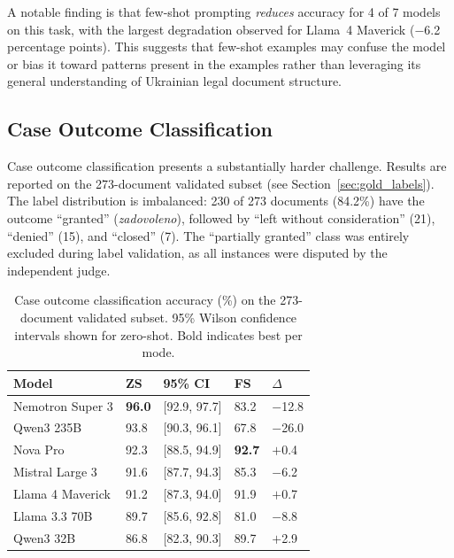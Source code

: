 \documentclass[11pt,a4paper]{article}
\begin{document}
A notable finding is that few-shot prompting \emph{reduces} accuracy for 4 of 7 models on this task, with the largest degradation observed for Llama~4 Maverick ($-$6.2 percentage points). This suggests that few-shot examples may confuse the model or bias it toward patterns present in the examples rather than leveraging its general understanding of Ukrainian legal document structure.

\subsection{Case Outcome Classification}
\label{sec:results_outcome}

Case outcome classification presents a substantially harder challenge. Results are reported on the 273-document validated subset (see Section~\ref{sec:gold_labels}). The label distribution is imbalanced: 230 of 273 documents (84.2\%) have the outcome ``granted'' (\textit{zadovoleno}), followed by ``left without consideration'' (21), ``denied'' (15), and ``closed'' (7). The ``partially granted'' class was entirely excluded during label validation, as all instances were disputed by the independent judge.

\begin{table}[t]
\centering
\caption{Case outcome classification accuracy (\%) on the 273-document validated subset. 95\% Wilson confidence intervals shown for zero-shot. Bold indicates best per mode.}
\label{tab:case_outcome}
\begin{tabular}{lR{1.6cm}R{2.6cm}R{1.6cm}R{1.6cm}}
\toprule
\textbf{Model} & \textbf{ZS} & \textbf{95\% CI} & \textbf{FS} & \textbf{$\Delta$} \\
\midrule
Nemotron Super 3  & \textbf{96.0} & [92.9, 97.7] & 83.2 & $-$12.8 \\
Qwen3 235B        & 93.8          & [90.3, 96.1] & 67.8 & $-$26.0 \\
Nova Pro          & 92.3          & [88.5, 94.9] & \textbf{92.7} & $+$0.4 \\
Mistral Large 3   & 91.6          & [87.7, 94.3] & 85.3 & $-$6.2 \\
Llama 4 Maverick  & 91.2          & [87.3, 94.0] & 91.9 & $+$0.7 \\
Llama 3.3 70B     & 89.7          & [85.6, 92.8] & 81.0 & $-$8.8 \\
Qwen3 32B         & 86.8          & [82.3, 90.3] & 89.7 & $+$2.9 \\
\bottomrule
\end{tabular}
\end{table}
\end{document}
